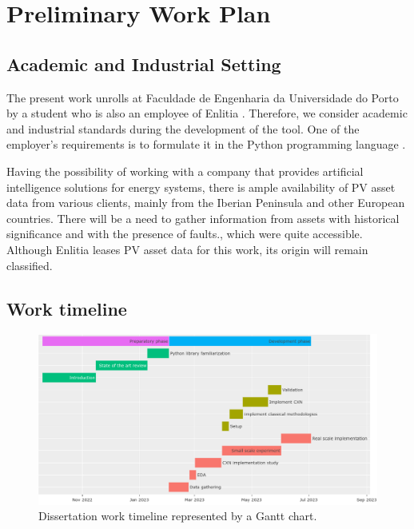 \chapter{Preliminary Work Plan} \label{chap:chap3}

\section{Academic and Industrial Setting}

The present work unrolls at Faculdade de Engenharia da Universidade do Porto by a student who is also an employee of Enlitia \cite{EL}. Therefore, we consider academic and industrial standards during the development of the tool. One of the employer's requirements is to formulate it in the Python programming language \cite{Python}.

Having the possibility of working with a company that provides artificial intelligence solutions for energy systems, there is ample availability of PV asset data from various clients, mainly from the Iberian Peninsula and other European countries. There will be a need to gather information from assets with historical significance and with the presence of faults., which were quite accessible. Although Enlitia leases PV asset data for this work, its origin will remain classified.

\section{Work timeline}

\begin{figure}[h!]
    \centering
    \includegraphics[width=\linewidth]{figures/chapter3/gantt.png} \caption{Dissertation work timeline represented by a Gantt chart.}
    \label{fig:gantt}
\end{figure}

